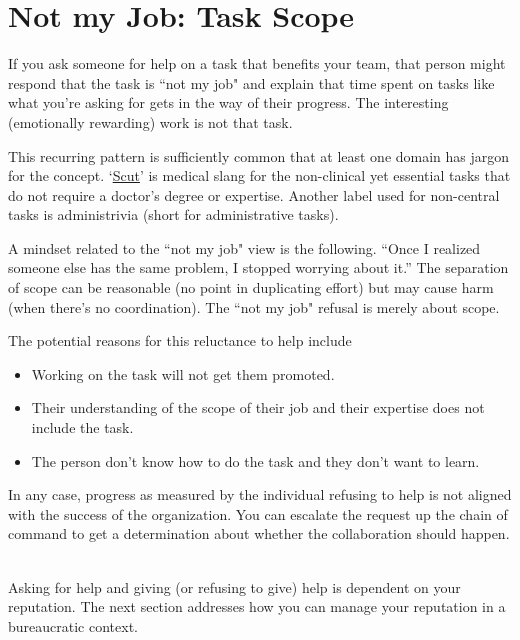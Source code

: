 \section{Not my Job: Task Scope}


If you ask someone for help on a task that benefits your team, that person might respond that the task is ``not my job" and explain that time spent on tasks like what you're asking for gets in the way of their progress. The interesting (emotionally rewarding) work is not that task.

This recurring pattern is sufficiently common that at least one domain has jargon for the concept.
`\href{https://www.urbandictionary.com/define.php?term=scut}{Scut}' 
is medical slang for the non-clinical yet essential tasks that do not require a doctor's degree or expertise.
Another label used for non-central tasks is administrivia (short for administrative tasks).

A mindset related to the ``not my job" view is the following.
``Once I realized someone else has the same problem, I stopped worrying about it.'' The separation of scope can be reasonable (no point in duplicating effort) but may cause harm (when there's no coordination). The ``not my job" refusal is merely about scope. 

The potential reasons for this reluctance to help include
\begin{itemize}
    \item Working on the task will not get them promoted.
    \item Their understanding of the scope of their job and their expertise does not include the task.
    \item The person don't know how to do the task and they don't want to learn.
\end{itemize}
In any case, progress as measured by the individual refusing to help is not aligned with the success of the organization. You can escalate the request up the chain of command to get a determination about whether the collaboration should happen.

\ \\


Asking for help and giving (or refusing to give) help is dependent on your reputation.
The next section addresses how you can manage your reputation in a bureaucratic context.